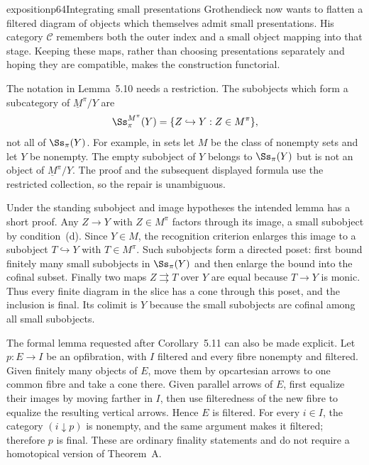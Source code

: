 \begin{dcomment}{exposition}{p64}{Integrating small presentations}
Grothendieck now wants to flatten a filtered diagram of objects which themselves admit small presentations. His category $\mathcal C$ remembers both the outer index and a small object mapping into that stage. Keeping these maps, rather than choosing presentations separately and hoping they are compatible, makes the construction functorial.

The notation in Lemma~5.10 needs a restriction. The subobjects which form a subcategory of $\underline M^\pi/Y$ are
\[
 \Ss_\pi^{M^\pi}(Y)=\{Z\hookrightarrow Y:Z\in M^\pi\},
\]
not all of $\Ss_\pi(Y)$. For example, in sets let $M$ be the class of nonempty sets and let $Y$ be nonempty. The empty subobject of $Y$ belongs to $\Ss_\pi(Y)$ but is not an object of $\underline M^\pi/Y$. The proof and the subsequent displayed formula use the restricted collection, so the repair is unambiguous.

Under the standing subobject and image hypotheses the intended lemma has a short proof. Any $Z\to Y$ with $Z\in M^\pi$ factors through its image, a small subobject by condition~(d). Since $Y\in M$, the recognition criterion enlarges this image to a subobject $T\hookrightarrow Y$ with $T\in M^\pi$. Such subobjects form a directed poset: first bound finitely many small subobjects in $\Ss_\pi(Y)$ and then enlarge the bound into the cofinal subset. Finally two maps $Z\rightrightarrows T$ over $Y$ are equal because $T\to Y$ is monic. Thus every finite diagram in the slice has a cone through this poset, and the inclusion is final. Its colimit is $Y$ because the small subobjects are cofinal among all small subobjects.

The formal lemma requested after Corollary~5.11 can also be made explicit. Let $p:E\to I$ be an opfibration, with $I$ filtered and every fibre nonempty and filtered. Given finitely many objects of $E$, move them by opcartesian arrows to one common fibre and take a cone there. Given parallel arrows of $E$, first equalize their images by moving farther in $I$, then use filteredness of the new fibre to equalize the resulting vertical arrows. Hence $E$ is filtered. For every $i\in I$, the category $(i\downarrow p)$ is nonempty, and the same argument makes it filtered; therefore $p$ is final. These are ordinary finality statements and do not require a homotopical version of Theorem~A.


\end{dcomment}
